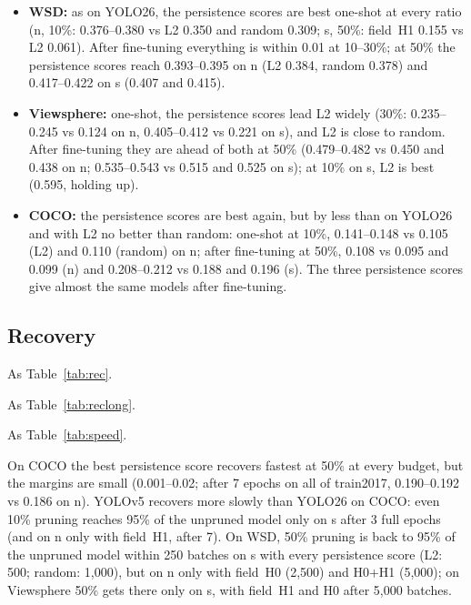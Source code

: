 \documentclass[10pt]{article}
\newcommand{\tnote}[1]{\par\vspace{3pt}\begin{minipage}{\linewidth}\footnotesize #1\end{minipage}}  %
\newcommand{\tbl}[1]{\adjustbox{max width=\linewidth}{}}
\begin{document}
\begin{itemize}
\item \textbf{WSD:} as on YOLO26, the persistence scores are best one-shot at every ratio (n, 10\%:
  0.376--0.380 vs L2 0.350 and random 0.309; s, 50\%: field~H1 0.155 vs L2 0.061). After fine-tuning
  everything is within 0.01 at 10--30\%; at 50\% the persistence scores reach 0.393--0.395 on n (L2
  0.384, random 0.378) and 0.417--0.422 on s (0.407 and 0.415).
\item \textbf{Viewsphere:} one-shot, the persistence scores lead L2 widely (30\%: 0.235--0.245 vs
  0.124 on n, 0.405--0.412 vs 0.221 on s), and L2 is close to random. After fine-tuning they are ahead
  of both at 50\% (0.479--0.482 vs 0.450 and 0.438 on n; 0.535--0.543 vs 0.515 and 0.525 on s); at 10\%
  on s, L2 is best (0.595, holding up).
\item \textbf{COCO:} the persistence scores are best again, but by less than on YOLO26 and with L2
  no better than random: one-shot at 10\%, 0.141--0.148 vs 0.105 (L2) and 0.110 (random) on n;
  after fine-tuning at 50\%, 0.108 vs 0.095 and 0.099 (n) and 0.208--0.212 vs 0.188 and 0.196 (s).
  The three persistence scores give almost the same models after fine-tuning.
\end{itemize}

\subsection{Recovery}

\begin{table}[H]
\centering\small
\caption{YOLOv5: recovery after channel pruning, by training budget}
\tbl{recovery_v5}
\tnote{As Table~\ref{tab:rec}.}
\end{table}

\begin{table}[H]
\centering\small
\caption{YOLOv5, COCO: recovery with longer fine-tunes}
\tbl{recovery_coco_long_v5}
\tnote{As Table~\ref{tab:reclong}.}
\end{table}

\begin{table}[H]
\centering\small
\caption{YOLOv5: training needed to reach 95\% of the unpruned model}
\tbl{recovery_speed_v5}
\tnote{As Table~\ref{tab:speed}.}
\end{table}

On COCO the best persistence score recovers fastest at 50\% at every budget, but the margins are
small (0.001--0.02; after 7 epochs on all of train2017, 0.190--0.192 vs 0.186 on n). YOLOv5 recovers more
slowly than YOLO26 on COCO: even 10\% pruning reaches 95\% of the unpruned model only on s after 3
full epochs (and on n only with field~H1, after 7). On WSD, 50\% pruning is back to 95\% of the
unpruned model within 250 batches on s with every persistence score (L2: 500; random: 1,000), but on n
only with field~H0 (2,500) and H0+H1 (5,000); on Viewsphere 50\% gets there only on s, with field~H1
and H0 after 5,000 batches.
\end{document}
